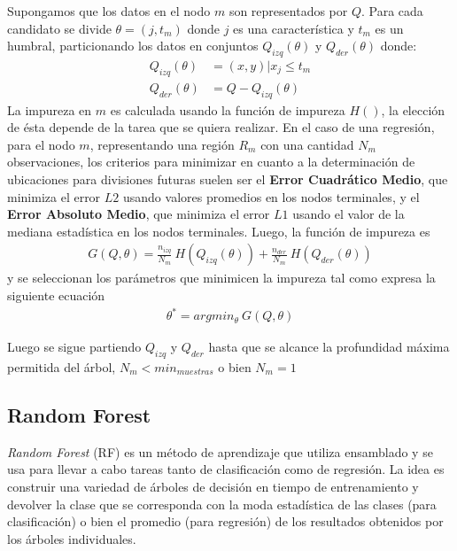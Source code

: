   \par Supongamos que los datos en el nodo $m$ son representados por $Q$. Para cada
    candidato se divide $\theta = (j, t_{m})$ donde $j$ es una característica y
    $t_{m}$ es un humbral, particionando los datos en conjuntos $Q_{izq}(\theta)$ y
    $Q_{der}(\theta)$ donde:
    \begin{align}
      Q_{izq}(\theta) &= (x, y) | x_{j} \leq t_m \\
      Q_{der}(\theta) &= Q - Q_{izq}(\theta)
    \end{align}
    La impureza en $m$ es calculada usando la función de impureza $H()$, la elección
    de ésta depende de la tarea que se quiera realizar.
    En el caso de una regresión, para el nodo $m$, representando una
    región $R_{m}$ con una cantidad $N_{m}$ observaciones, los criterios
    para minimizar en cuanto a la determinación de ubicaciones para divisiones
    futuras suelen ser el \textbf{Error Cuadrático Medio}, que minimiza el error $L2$ usando
    valores promedios en los nodos terminales, y el \textbf{Error Absoluto Medio}, que minimiza
    el error $L1$ usando el valor de la mediana estadística en los nodos terminales.
    Luego, la función de impureza es
    \begin{align}
      G(Q, \theta) = \frac{n_{izq}}{N_{m}} \ H(Q_{izq}(\theta)) + \frac{n_{der}}{N_{m}} \ H(Q_{der}(\theta))
    \end{align}
    y se seleccionan los parámetros que minimicen la impureza tal como expresa la
    siguiente ecuación
    \begin{align}
      \theta^{*} = argmin_{\theta} \ G(Q, \theta)
    \end{align}

    Luego se sigue partiendo $Q_{izq}$ y $Q_{der}$ hasta que se alcance la profundidad
    máxima permitida del árbol, $N_{m} < min_{muestras}$ o bien $N_{m} = 1$


\subsection{Random Forest}

  \par \textit{Random Forest} (RF) es un método de aprendizaje que utiliza ensamblado y se
    usa para llevar a cabo tareas tanto de clasificación como de regresión.
    La idea es construir una variedad de árboles de decisión en tiempo de entrenamiento
    y devolver la clase que se corresponda con la moda estadística de las clases
    (para clasificación) o bien el promedio (para regresión) de los resultados
    obtenidos por los árboles individuales.

